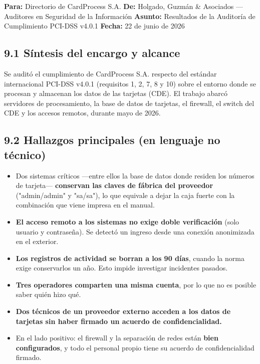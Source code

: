 \documentclass[11pt,a4paper]{article}
\begin{document}
\textbf{Para:} Directorio de CardProcess S.A.
\textbf{De:} Holgado, Guzmán \& Asociados — Auditores en Seguridad de la Información
\textbf{Asunto:} Resultados de la Auditoría de Cumplimiento PCI-DSS v4.0.1
\textbf{Fecha:} 22 de junio de 2026

\subsection{9.1 Síntesis del encargo y alcance}

Se auditó el cumplimiento de CardProcess S.A. respecto del estándar internacional PCI-DSS v4.0.1 (requisitos 1, 2, 7, 8 y 10) sobre el entorno donde se procesan y almacenan los datos de las tarjetas (CDE). El trabajo abarcó servidores de procesamiento, la base de datos de tarjetas, el firewall, el switch del CDE y los accesos remotos, durante mayo de 2026.

\subsection{9.2 Hallazgos principales (en lenguaje no técnico)}

\begin{itemize}[leftmargin=*]
  \item Dos sistemas críticos —entre ellos la base de datos donde residen los números de tarjeta— \textbf{conservan las claves de fábrica del proveedor} ("admin/admin" y "sa/sa"), lo que equivale a dejar la caja fuerte con la combinación que viene impresa en el manual.
  \item \textbf{El acceso remoto a los sistemas no exige doble verificación} (solo usuario y contraseña). Se detectó un ingreso desde una conexión anonimizada en el exterior.
  \item \textbf{Los registros de actividad se borran a los 90 días}, cuando la norma exige conservarlos un año. Esto impide investigar incidentes pasados.
  \item \textbf{Tres operadores comparten una misma cuenta}, por lo que no es posible saber quién hizo qué.
  \item \textbf{Dos técnicos de un proveedor externo acceden a los datos de tarjetas sin haber firmado un acuerdo de confidencialidad.}
  \item En el lado positivo: el firewall y la separación de redes están \textbf{bien configurados}, y todo el personal propio tiene su acuerdo de confidencialidad firmado.
\end{itemize}
\end{document}
